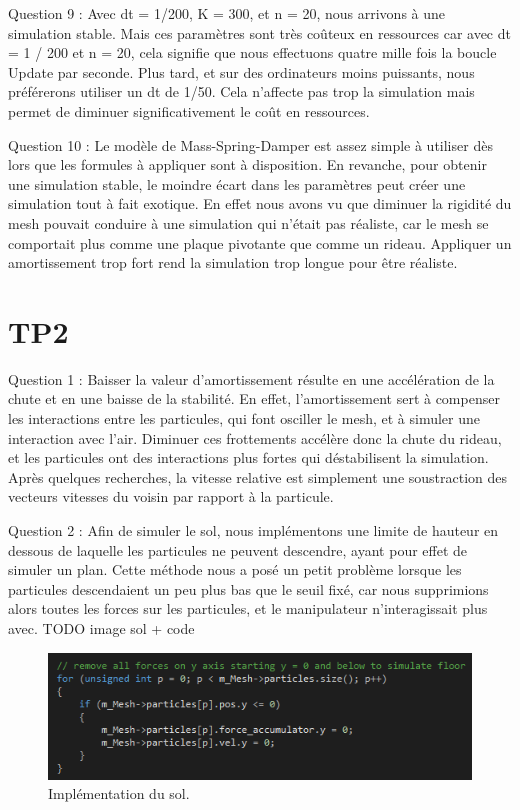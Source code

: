 \documentclass[a4paper,12pt]{article}
\begin{document}
Question 9 : 	Avec dt = 1/200, K = 300, et n = 20, nous arrivons à une simulation stable. Mais ces paramètres sont très coûteux en ressources car avec dt = 1 / 200 et n = 20, cela signifie que nous effectuons quatre mille fois la boucle \og{}Update\fg{} par seconde. Plus tard, et sur des ordinateurs moins puissants, nous préférerons utiliser un dt de 1/50. Cela n'affecte pas trop la simulation mais permet de diminuer significativement le coût en ressources.

Question 10 : Le modèle de Mass-Spring-Damper est assez simple à utiliser dès lors que les formules à appliquer sont à disposition. En revanche, pour obtenir une simulation stable, le moindre écart dans les paramètres peut créer une simulation tout à fait exotique. En effet nous avons vu que diminuer la rigidité du mesh pouvait conduire à une simulation qui n'était pas réaliste, car le mesh se comportait plus comme une plaque pivotante que comme un rideau. Appliquer un amortissement trop fort rend la simulation trop longue pour être réaliste.

\section{TP2}

Question 1 : Baisser la valeur d'amortissement résulte en une accélération de la chute et en une baisse de la stabilité. En effet, l'amortissement sert à compenser les interactions entre les particules, qui font osciller le mesh, et à simuler une interaction avec l'air. Diminuer ces \og{}frottements\fg{} accélère donc la chute du rideau, et les particules ont des interactions plus fortes qui déstabilisent la simulation. Après quelques recherches, la vitesse relative est simplement une soustraction des vecteurs vitesses du voisin par rapport à la particule.

Question 2 : Afin de simuler le sol, nous implémentons une limite de hauteur en dessous de laquelle les particules ne peuvent descendre, ayant pour effet de simuler un plan. Cette méthode nous a posé un petit problème lorsque les particules descendaient un peu plus bas que le seuil fixé, car nous supprimions alors toutes les forces sur les particules, et le manipulateur n’interagissait plus avec.
TODO image sol + code
\begin{figure}
  \centering
  \includegraphics{images/sol_code.png}
  \caption{Implémentation du sol.}
  \label{fig:}
\end{figure}
\end{document}
